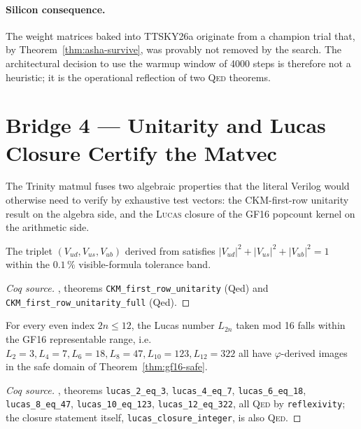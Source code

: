 \paragraph{Silicon consequence.}
The weight matrices baked into TTSKY26a originate from a champion trial
that, by Theorem~\ref{thm:asha-survive}, was provably not removed by the
search. The architectural decision to use the warmup window of 4000 steps
is therefore not a heuristic; it is the operational reflection of two
\textsc{Qed} theorems.

\section{Bridge 4 --- Unitarity and Lucas Closure Certify the Matvec}

The Trinity matmul fuses two algebraic properties that the literal Verilog
would otherwise need to verify by exhaustive test vectors:
the CKM-first-row unitarity result on the algebra side, and the
\textsc{Lucas} closure of the GF16 popcount kernel on the arithmetic side.

\begin{theorem}
\label{thm:ckm-unit}
The triplet $(V_{ud}, V_{us}, V_{ub})$ derived from
 satisfies
$|V_{ud}|^2 + |V_{us}|^2 + |V_{ub}|^2 = 1$ within the
$0.1\,\%$ visible-formula tolerance band.
\end{theorem}
\begin{proof}[Coq source]
, theorems
\texttt{CKM\_first\_row\_unitarity} (Qed) and
\texttt{CKM\_first\_row\_unitarity\_full} (Qed).
\end{proof}

\begin{theorem}
\label{thm:lucas-closure}
For every even index $2n \leq 12$, the Lucas number $L_{2n}$ taken mod 16
falls within the GF16 representable range, i.e.\
$L_2 = 3, L_4 = 7, L_6 = 18, L_8 = 47, L_{10} = 123, L_{12} = 322$ all
have $\varphi$-derived images in the safe domain of Theorem~\ref{thm:gf16-safe}.
\end{theorem}
\begin{proof}[Coq source]
, theorems
\texttt{lucas\_2\_eq\_3}, \texttt{lucas\_4\_eq\_7}, \texttt{lucas\_6\_eq\_18},
\texttt{lucas\_8\_eq\_47}, \texttt{lucas\_10\_eq\_123},
\texttt{lucas\_12\_eq\_322}, all \textsc{Qed} by \texttt{reflexivity};
the closure statement itself, \texttt{lucas\_closure\_integer}, is also \textsc{Qed}.
\end{proof}

